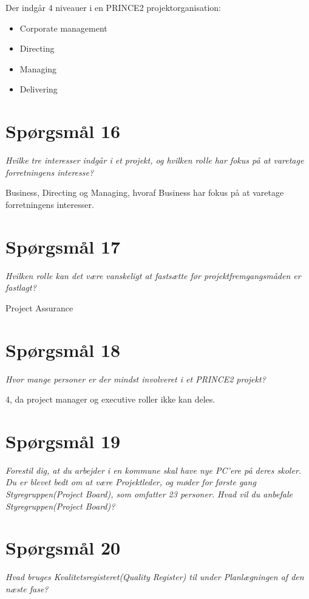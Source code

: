 Der indgår 4 niveauer i en PRINCE2 projektorganisation:

\begin{itemize}
    \item Corporate management
    \item Directing
    \item Managing
    \item Delivering
\end{itemize}

\section{Spørgsmål 16}
\textit{Hvilke tre interesser indgår i et projekt, og hvilken rolle har fokus på at varetage forretningens interesse?}

Business, Directing og Managing, hvoraf Business har fokus på at varetage forretningens interesser.

\section{Spørgsmål 17}
\textit{Hvilken rolle kan det være vanskeligt at fastsætte før projektfremgangsmåden er fastlagt?}

Project Assurance

\section{Spørgsmål 18}
\textit{Hvor mange personer er der mindst involveret i et PRINCE2 projekt?}

4, da project manager og executive roller ikke kan deles.

\section{Spørgsmål 19}
\textit{Forestil dig, at du arbejder i en kommune skal have nye PC’ere på deres skoler. Du er blevet bedt om at være Projektleder, og møder for første gang Styregruppen(Project Board), som omfatter 23 personer. Hvad vil du anbefale Styregruppen(Project Board)?}



\section{Spørgsmål 20}
\textit{Hvad bruges Kvalitetsregisteret(Quality Register) til under Planlægningen af den næste fase?}

